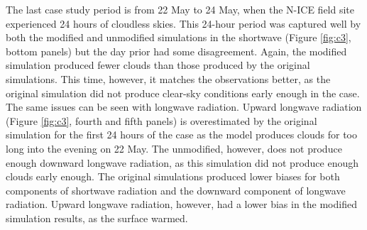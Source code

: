 The last case study period is from 22 May to 24 May, when the N-ICE field site experienced 24 hours of cloudless skies. This 24-hour period was captured well by both the modified and unmodified simulations in the shortwave (Figure \ref{fig:c3}, bottom panels) but the day prior had some disagreement. Again, the modified simulation produced fewer clouds than those produced by the original simulations. This time, however, it matches the observations better, as the original simulation did not produce clear-sky conditions early enough in the case. The same issues can be seen with longwave radiation. Upward longwave radiation (Figure \ref{fig:c3}, fourth and fifth panels) is overestimated by the original simulation for the first 24 hours of the case as the model produces clouds for too long into the evening on 22 May. The unmodified, however, does not produce enough downward longwave radiation, as this simulation did not produce enough clouds early enough. The original simulations produced lower biases for both components of shortwave radiation and the downward component of longwave radiation. Upward longwave radiation, however, had a lower bias in the modified simulation results, as the surface warmed. 


